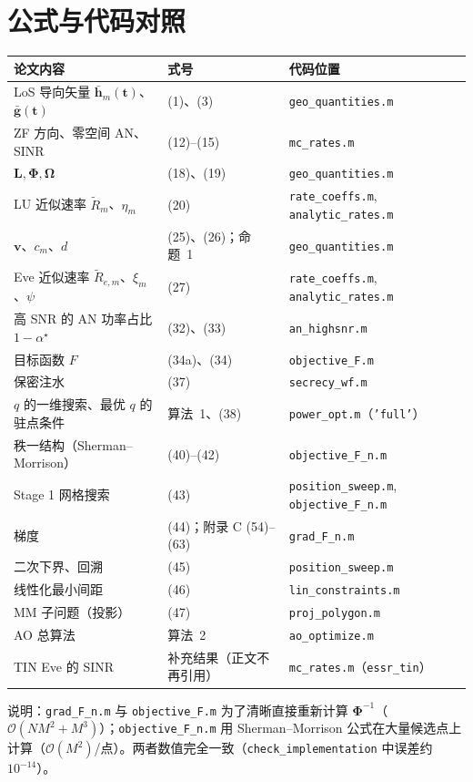\documentclass[11pt,a4paper]{ctexart}
\newcommand{\code}[1]{\texttt{#1}}
\newcommand{\bt}{\mathbf t}
\begin{document}
\section{公式与代码对照}
\begin{longtable}{p{5.6cm}p{3.6cm}p{6.2cm}}
\toprule
论文内容 & 式号 & 代码位置 \\ \midrule
LoS 导向矢量 $\bar{\mathbf h}_m(\bt)$、$\bar{\mathbf g}(\bt)$ & (1)、(3) & \code{geo\_quantities.m} \\
ZF 方向、零空间 AN、SINR & (12)--(15) & \code{mc\_rates.m} \\
$\mathbf L,\boldsymbol\Phi,\boldsymbol\Omega$ & (18)、(19) & \code{geo\_quantities.m} \\
LU 近似速率 $\tilde R_m$、$\eta_m$ & (20) & \code{rate\_coeffs.m}, \code{analytic\_rates.m} \\
$\mathbf v$、$c_m$、$d$ & (25)、(26)；命题~1 & \code{geo\_quantities.m} \\
Eve 近似速率 $\tilde R_{e,m}$、$\xi_m$、$\psi$ & (27) & \code{rate\_coeffs.m}, \code{analytic\_rates.m} \\
高 SNR 的 AN 功率占比 $1-\alpha^\star$ & (32)、(33) & \code{an\_highsnr.m} \\
目标函数 $F$ & (34a)、(34) & \code{objective\_F.m} \\
保密注水 & (37) & \code{secrecy\_wf.m} \\
$q$ 的一维搜索、最优 $q$ 的驻点条件 & 算法~1、(38) & \code{power\_opt.m}（\code{'full'}）\\
秩一结构（Sherman--Morrison）& (40)--(42) & \code{objective\_F\_n.m} \\
Stage 1 网格搜索 & (43) & \code{position\_sweep.m}, \code{objective\_F\_n.m} \\
梯度 & (44)；附录 C (54)--(63) & \code{grad\_F\_n.m} \\
二次下界、回溯 & (45) & \code{position\_sweep.m} \\
线性化最小间距 & (46) & \code{lin\_constraints.m} \\
MM 子问题（投影） & (47) & \code{proj\_polygon.m} \\
AO 总算法 & 算法~2 & \code{ao\_optimize.m} \\
TIN Eve 的 SINR & 补充结果（正文不再引用） & \code{mc\_rates.m}（\code{essr\_tin}）\\
\bottomrule
\end{longtable}
\noindent 说明：\code{grad\_F\_n.m} 与 \code{objective\_F.m} 为了清晰直接重新计算 $\boldsymbol\Phi^{-1}$（$\mathcal O(NM^2+M^3)$）；\code{objective\_F\_n.m} 用 Sherman--Morrison 公式在大量候选点上计算（$\mathcal O(M^2)$/点）。两者数值完全一致（\code{check\_implementation} 中误差约 $10^{-14}$）。
\end{document}
